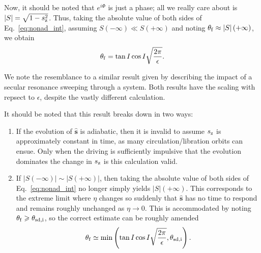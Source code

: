 \documentclass[
        fleqn,
        usenatbib,
    ]{mnras}
\newcommand*{\abs}[1]{\left|#1\right|}
\newcommand*{\bm}[1]{\boldsymbol{\mathbf{#1}}}
\newcommand*{\uv}[1]{\hat{\bm{#1}}}
\newcommand*{\p}[1]{\left(#1\right)}
\begin{document}
Now, it should be noted that $e^{i\Phi}$ is just a phase; all we really care
about is $\abs{S} = \sqrt{1 - s_{\rm z}^2}$. Thus, taking the absolute value of both
sides of Eq.~\eqref{eq:nonad_int}, assuming $S\p{-\infty} \ll S\p{+\infty}$ and
noting $\theta_{\rm f} \approx \abs{S}(+\infty)$, we obtain
\begin{equation}
    \theta_{\rm f} = \tan I\cos I\sqrt{\frac{2\pi}{\epsilon}}.
        \label{eq:nonad_dong}
\end{equation}

We note the resemblance to a similar result given by \citet{malhotra_calc}
describing the impact of a secular resonance sweeping through a system. Both
results have the scaling with repsect to $\epsilon$, despite the vastly
different calculation.

It should be noted that this result breaks down in two ways:
\begin{enumerate}
    \item If the evolution of $\uv{s}$ is adiabatic, then it is invalid to
        assume $s_{\rm z}$ is approximately constant in time, as many
        circulation/libration orbits can ensue. Only when the driving is
        sufficiently impulsive that the evolution dominates the change in
        $s_{\rm z}$
        is this calculation valid.

    \item If $\abs{S\p{-\infty}} \sim \abs{S\p{+\infty}}$, then taking the
        absolute value of both sides of Eq.~\eqref{eq:nonad_int} no longer
        simply yields $\abs{S}\p{+\infty}$. This corresponds to the extreme
        limit where $\eta$ changes so suddenly that $\uv{s}$ has no time to
        respond and remains roughly unchanged as $\eta \to 0$. This is
        accommodated by noting $\theta_{\rm f} \geq \theta_{\rm sd, i}$, so the
        correct estimate can be roughly amended
        \begin{equation}
            \theta_{\rm f} \simeq \min\p{\tan I\cos
                I\sqrt{\frac{2\pi}{\epsilon}}, \theta_{\rm sd, i}}.
        \end{equation}
\end{enumerate}

\bsp
\label{lastpage} %
\end{document}
